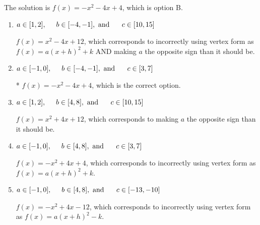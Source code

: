 \documentclass{extbook}[14pt]
\begin{document}
\begin{enumerate}
{The solution is \( f(x) = -x^{2} -4 x + 4 \), which is option B.\begin{enumerate}[label=\Alph*.]
\item \( a \in [1, 2], \hspace*{5mm} b \in [-4, -1], \text{ and } \hspace*{5mm} c \in [10, 15] \)

$f(x)=x^{2} -4 x + 12$, which corresponds to incorrectly using vertex form as $f(x) = a(x+h)^2+k$ AND making $a$ the opposite sign than it should be.
\item \( a \in [-1, 0], \hspace*{5mm} b \in [-4, -1], \text{ and } \hspace*{5mm} c \in [3, 7] \)

* $f(x)=-x^{2} -4 x + 4$, which is the correct option.
\item \( a \in [1, 2], \hspace*{5mm} b \in [4, 8], \text{ and } \hspace*{5mm} c \in [10, 15] \)

$f(x)=x^{2} +4 x + 12$, which corresponds to making $a$ the opposite sign than it should be.
\item \( a \in [-1, 0], \hspace*{5mm} b \in [4, 8], \text{ and } \hspace*{5mm} c \in [3, 7] \)

$f(x)=-x^{2} +4 x + 4$, which corresponds to incorrectly using vertex form as $f(x) = a(x+h)^2+k$.
\item \( a \in [-1, 0], \hspace*{5mm} b \in [4, 8], \text{ and } \hspace*{5mm} c \in [-13, -10] \)

$f(x)=-x^{2} +4 x -12$, which corresponds to incorrectly using vertex form as $f(x) = a(x+h)^2 - k$.
\end{enumerate}

}
\end{enumerate}
\end{document}
